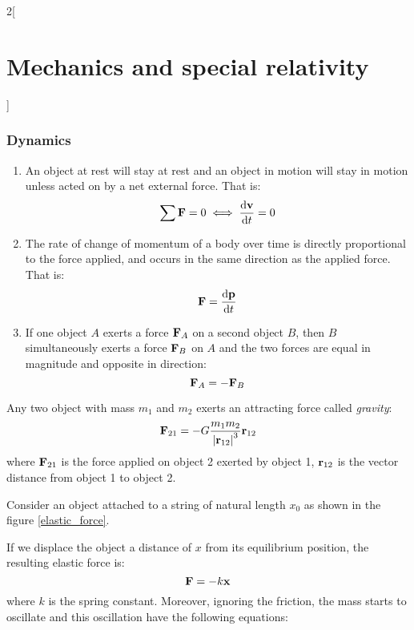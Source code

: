 \documentclass[../../../main.tex]{subfiles}
\begin{document}
\begin{multicols}{2}[\section{Mechanics and special relativity}]
  \subsubsection*{Dynamics}
  \begin{law}
    \hfill
    \begin{enumerate}
      \item An object at rest will stay at rest and an object in motion will stay in motion unless acted on by a net external force. That is: $$\sum\vb{F}=0\iff\dv{\vb{v}}{t}=0$$
      \item The rate of change of momentum of a body over time is directly proportional to the force applied, and occurs in the same direction as the applied force. That is: $$\vb{F}=\dv{\vb{p}}{t}$$
      \item If one object $A$ exerts a force $\vb{F}_A$ on a second object $B$, then $B$ simultaneously exerts a force $\vb{F}_B$ on $A$ and the two forces are equal in magnitude and opposite in direction: $$\vb{F}_A=-\vb{F}_B$$
    \end{enumerate}
  \end{law}
  \begin{prop}
    Any two object with mass $m_1$ and $m_2$ exerts an attracting force called \textit{gravity}:
    $$\vb{F}_{21}=-G\frac{m_1m_2}{{|\vb{r}_{12}|}^3}\vb{r}_{12}$$
    where $\vb{F}_{21}$ is the force applied on object 2 exerted by object 1, $\vb{r}_{12}$ is the vector distance from object 1 to object 2.
  \end{prop}
  \begin{prop}
    Consider an object attached to a string of natural length $x_0$ as shown in the figure \ref{elastic_force}.
    \begin{center}
      \begin{minipage}{\linewidth}
        \centering
        
        \label{elastic_force}
      \end{minipage}
    \end{center}
    If we displace the object a distance of $x$ from its equilibrium position, the resulting elastic force is: $$\vb{F}=-k\vb{x}$$ where $k$ is the spring constant. Moreover, ignoring the friction, the mass starts to oscillate and this oscillation have the following equations:
    \begin{gather*}

\end{gather*}
\end{prop}
\end{multicols}
\end{document}
